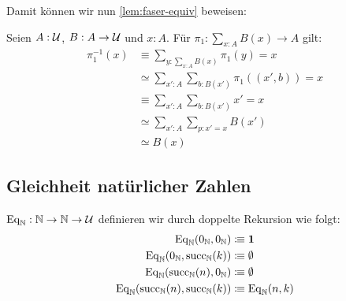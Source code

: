 Damit können wir nun \cref{lem:faser-equiv} beweisen:

\begin{beweis}
  Seien $A:\mathcal{U}$, $B:A\to\mathcal{U}$ und $x:A$. Für $\pi_1:\sum_{x:A}B(x)\to A$ gilt:
  \begin{align*}
    \pi_1^{-1}(x)&\equiv \sum_{y:\sum_{x:A}B(x)}\pi_1(y)=x\\
                 &\simeq \sum_{x':A}\sum_{b:B(x')}\pi_1((x',b))=x \\
                 &\equiv \sum_{x':A}\sum_{b:B(x')} x'=x \\
                 &\simeq \sum_{x':A}\sum_{p:x'=x}B(x')\\
                 &\simeq B(x)
  \end{align*}
\end{beweis}


\subsection{Gleichheit natürlicher Zahlen}
\label{sec:zahlen-gleichheit}
\begin{definition}
  $\mathrm{Eq}_{\mathbb{N}}:\mathbb{N}\to\mathbb{N}\to\mathcal{U}$ definieren wir durch doppelte Rekursion wie folgt:
  \begin{align*}
    \mathrm{Eq}_{\mathbb{N}}(0_{\mathbb{N}},    0_{\mathbb{N}})     &\vcentcolon\mspace{-1.2mu}\equiv\mathbf{1} \\
    \mathrm{Eq}_{\mathbb{N}}(0_{\mathbb{N}},    \mathrm{succ}_{\mathbb{N}}(k)) &\vcentcolon\mspace{-1.2mu}\equiv\emptyset \\
    \mathrm{Eq}_{\mathbb{N}}(\mathrm{succ}_{\mathbb{N}}(n),0_{\mathbb{N}})     &\vcentcolon\mspace{-1.2mu}\equiv\emptyset \\
    \mathrm{Eq}_{\mathbb{N}}(\mathrm{succ}_{\mathbb{N}}(n),\mathrm{succ}_{\mathbb{N}}(k)) &\vcentcolon\mspace{-1.2mu}\equiv\mathrm{Eq}_{\mathbb{N}}(n,k) 
  \end{align*}
\end{definition}

